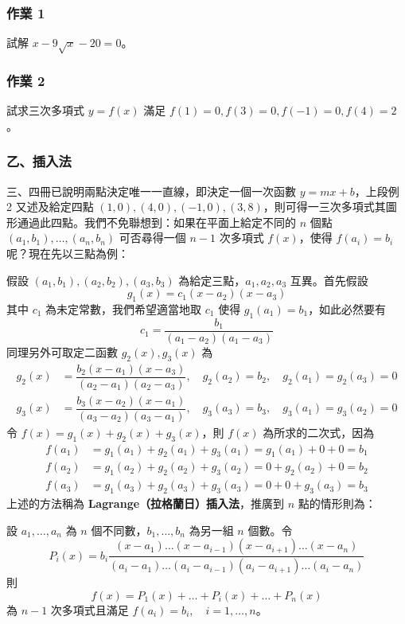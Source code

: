 \subsubsection*{作業 1}\label{hw:b6-2-1}
試解 $x - 9\sqrt{x} - 20 = 0$。

\subsubsection*{作業 2}\label{hw:b6-2-2}
試求三次多項式 $y=f(x)$ 滿足 $f(1)=0, f(3)=0, f(-1)=0, f(4)=2$。

\subsubsection*{乙、插入法}\label{subsec:b6-2-1-b}

三、四冊已說明兩點決定唯一一直線，即決定一個一次函數 $y=mx+b$，上段例 2 又述及給定四點 $(1, 0), (4, 0), (-1, 0), (3, 8)$，則可得一三次多項式其圖形通過此四點。我們不免聯想到：如果在平面上給定不同的 $n$ 個點 $(a_1, b_1), \dots, (a_n, b_n)$ 可否尋得一個 $n-1$ 次多項式 $f(x)$，使得 $f(a_i)=b_i$ 呢？現在先以三點為例：

假設 $(a_1, b_1), (a_2, b_2), (a_3, b_3)$ 為給定三點，$a_1, a_2, a_3$ 互異。首先假設
\[ g_1(x) = c_1(x-a_2)(x-a_3) \]
其中 $c_1$ 為未定常數，我們希望適當地取 $c_1$ 使得 $g_1(a_1)=b_1$，如此必然要有
\[ c_1 = \dfrac{b_1}{(a_1-a_2)(a_1-a_3)} \]
同理另外可取定二函數 $g_2(x), g_3(x)$ 為
\begin{align*}
g_2(x) &= \dfrac{b_2(x-a_1)(x-a_3)}{(a_2-a_1)(a_2-a_3)}, \quad g_2(a_2)=b_2, \quad g_2(a_1)=g_2(a_3)=0 \\
g_3(x) &= \dfrac{b_3(x-a_2)(x-a_1)}{(a_3-a_2)(a_3-a_1)}, \quad g_3(a_3)=b_3, \quad g_3(a_1)=g_3(a_2)=0
\end{align*}
令 $f(x) = g_1(x) + g_2(x) + g_3(x)$，則 $f(x)$ 為所求的二次式，因為
\begin{align*}
f(a_1) &= g_1(a_1) + g_2(a_1) + g_3(a_1) = g_1(a_1) + 0 + 0 = b_1 \\
f(a_2) &= g_1(a_2) + g_2(a_2) + g_3(a_2) = 0 + g_2(a_2) + 0 = b_2 \\
f(a_3) &= g_1(a_3) + g_2(a_3) + g_3(a_3) = 0 + 0 + g_3(a_3) = b_3
\end{align*}
上述的方法稱為 \textbf{Lagrange（拉格蘭日）插入法}，推廣到 $n$ 點的情形則為：

\begin{theorem}\label{thm:b6-2-lagrange}
設 $a_1, \dots, a_n$ 為 $n$ 個不同數，$b_1, \dots, b_n$ 為另一組 $n$ 個數。令
\[ P_i(x) = b_i \dfrac{(x-a_1)\dots(x-a_{i-1})(x-a_{i+1})\dots(x-a_n)}{(a_i-a_1)\dots(a_i-a_{i-1})(a_i-a_{i+1})\dots(a_i-a_n)} \]
則
\[ f(x) = P_1(x) + \dots + P_i(x) + \dots + P_n(x) \]
為 $n-1$ 次多項式且滿足 $f(a_i)=b_i, \quad i=1, \dots, n$。
\end{theorem}

